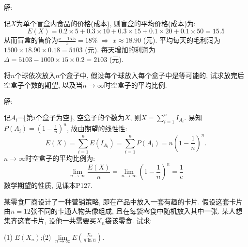 \documentclass[standard]{ExBook}
\begin{document}
\begin{qitems}
\vspace{-5em}

    \begin{bbox}
解: 

记$X$为单个盲盒内食品的价格(成本), 则盲盒的平均价格(成本)为:
$$E(X)=0.2\times5+0.3\times10+0.3\times15+0.1\times20+0.1\times50=15.5$$
从而盲盒的售价为$\frac{x-15.5}{x}=18\%$ $\Longrightarrow$ $x\approx18.90$ (元). 平均每天的毛利润为$1500\times18.90\times0.18=5103$ (元). 每天增加的利润为$\Delta=5103-1000\times15\times0.2=2103$ (元).
    \end{bbox}

\vspace{-5em}

    \begin{bbox}
    \begin{shaded}
        \qitem
将$n$个球依次放入$n$个盒子中, 假设每个球放入每个盒子中是等可能的, 试求放完后空盒子个数的期望, 以及当$n\to \infty$时空盒子的平均比例.
    \end{shaded}
    \end{bbox}

\vspace{-5em}

    \begin{bbox}
解: 

记$A_{i}$=\{第$i$个盒子为空\}, 空盒子的个数为$X$, 则$X=\displaystyle\sum\limits_{i=1}^{n}I_{A_{i}}$. 易知$P(A_{i})=\left(1-\frac{1}{n}\right)^{n}$, 故由期望的线性性:
$$E(X)=\displaystyle\sum\limits_{i=1}^{n}E(I_{A_{i}})=\sum\limits_{i=1}^{n}P(A_{i})=n\left(1-\frac{1}{n}\right)^{n}.$$
$n\to \infty$时空盒子的平均比例为:
$$\lim\limits_{n\to\infty}\frac{E(X)}{n}=\lim\limits_{n\to\infty}\left(1-\frac{1}{n}\right)^{n}=\frac{1}{e}$$
\textcolor{themeColor}{\selectfont {}
数学期望的性质, 见课本P127.}
    \end{bbox}

\vspace{-5em}

    \begin{bbox}
    \begin{shaded}
        \qitem
某零食厂商设计了一种营销策略, 即在产品中放入一套有趣的卡片. 假设这套卡片由$n =12$张不同的卡通人物头像组成, 且在每袋零食中随机放入其中一张. 某人想集齐这套卡片, 设他一共需要买$X_n$袋该零食. 试求:

\vspace{0.5em}
(1) $E(X_n)$;\qquad (2) $\lim\limits_{n\to\infty}E\left(\displaystyle\frac{X_n}{n\ln n}\right)$.
    \end{shaded}
    \end{bbox}


\end{qitems}
\end{document}
